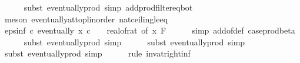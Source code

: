 \begin{isabellebody}
\ \ \ \ \isamarkupfalse%
\ {\isacharparenleft}{\kern0pt}subst\ eventually{\isacharunderscore}{\kern0pt}prod{}{\isacharprime}{\kern0pt}{\isacharcomma}{\kern0pt}\ simp\ add{\isacharcolon}{\kern0pt}prod{\isacharunderscore}{\kern0pt}filter{\isacharunderscore}{\kern0pt}eq{\isacharunderscore}{\kern0pt}bot{\isacharparenright}{\kern0pt}\isanewline
\ \ \ \ \isamarkupfalse%
\ {\isacharparenleft}{\kern0pt}meson\ eventually{\isacharunderscore}{\kern0pt}at{\isacharunderscore}{\kern0pt}top{\isacharunderscore}{\kern0pt}linorder\ nat{\isacharunderscore}{\kern0pt}ceiling{\isacharunderscore}{\kern0pt}le{\isacharunderscore}{\kern0pt}eq{\isacharparenright}{\kern0pt}\isanewline
\isanewline
\ \ \isamarkupfalse%
\ eps{\isacharunderscore}{\kern0pt}inf{\isacharcolon}{\kern0pt}\ {\isachardoublequoteopen}{\isasymAnd}c{\isachardot}{\kern0pt}\ eventually\ {\isacharparenleft}{\kern0pt}{\isasymlambda}x{\isachardot}{\kern0pt}\ c\ {\isasymle}\ {}\ {\isacharslash}{\kern0pt}\ {\isacharparenleft}{\kern0pt}real{\isacharunderscore}{\kern0pt}of{\isacharunderscore}{\kern0pt}rat\ {\isacharparenleft}{\kern0pt}{\isasymepsilon}{\isacharunderscore}{\kern0pt}of\ x{\isacharparenright}{\kern0pt}{\isacharparenright}{\kern0pt}{\isacharparenright}{\kern0pt}\ {\isacharquery}{\kern0pt}F{\isachardoublequoteclose}\isanewline
\ \ \ \ \isamarkupfalse%
\ {\isacharparenleft}{\kern0pt}simp\ add{\isacharcolon}{\kern0pt}{\isasymepsilon}{\isacharunderscore}{\kern0pt}of{\isacharunderscore}{\kern0pt}def\ case{\isacharunderscore}{\kern0pt}prod{\isacharunderscore}{\kern0pt}beta{\isacharprime}{\kern0pt}{\isacharparenright}{\kern0pt}\isanewline
\ \ \ \ \isamarkupfalse%
\ {\isacharparenleft}{\kern0pt}subst\ eventually{\isacharunderscore}{\kern0pt}prod{}{\isacharprime}{\kern0pt}{\isacharcomma}{\kern0pt}\ simp{\isacharparenright}{\kern0pt}\isanewline
\ \ \ \ \isamarkupfalse%
\ {\isacharparenleft}{\kern0pt}subst\ eventually{\isacharunderscore}{\kern0pt}prod{}{\isacharprime}{\kern0pt}{\isacharcomma}{\kern0pt}\ simp{\isacharparenright}{\kern0pt}\isanewline
\ \ \ \ \isamarkupfalse%
\ {\isacharparenleft}{\kern0pt}subst\ eventually{\isacharunderscore}{\kern0pt}prod{}{\isacharprime}{\kern0pt}{\isacharcomma}{\kern0pt}\ simp{\isacharparenright}{\kern0pt}\isanewline
\ \ \ \ \isamarkupfalse%
\ {\isacharparenleft}{\kern0pt}rule\ inv{\isacharunderscore}{\kern0pt}at{\isacharunderscore}{\kern0pt}right{\isacharunderscore}{\kern0pt}{}{\isacharunderscore}{\kern0pt}inf{\isacharparenright}{\kern0pt}\isanewline

\end{isabellebody}
